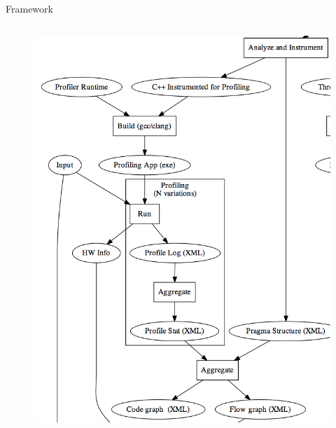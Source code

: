 \documentclass[xcolor=dvipsnames]{beamer}
\begin{document}
\begin{section}{Framework}










\begin{frame}{\hskip 0.3cm }
\begin{columns}
\begin{column}{6.5cm}
\vskip -1.7cm

\begin{figure}
\hskip -1cm
\includegraphics[scale=0.29]{zoom1.png}
\end{figure}


\end{column}
\end{columns}
\end{frame}
\end{section}
\end{document}
